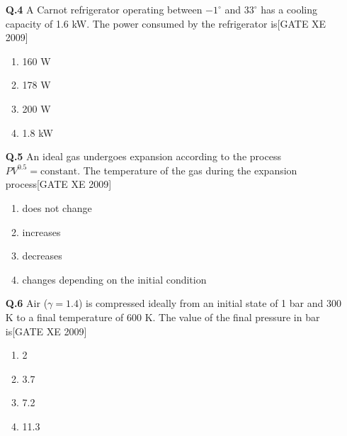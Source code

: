 \documentclass[journal,12pt,onecolumn]{IEEEtran}
\theoremstyle{remark}
\begin{document}
\begin{enumerate}
\begin{enumerate}
\begin{enumerate}
\vspace{0.3cm}

\item[\textbf{Q.4}]  A Carnot refrigerator operating between $-1^\circ$  and $33^\circ$  has a cooling capacity of 1.6 kW. The power consumed by the refrigerator is\hfill[GATE XE 2009]
\begin{multicols}{2}
\begin{enumerate}
    \item 160 W
    \item 178 W
    \item 200 W
    \item 1.8 kW
\end{enumerate}
\end{multicols}

\vspace{0.3cm}

\item[\textbf{Q.5}] An ideal gas undergoes expansion according to the process $PV^{0.5} = \text{constant}$. The temperature of the gas during the expansion process\hfill[GATE XE 2009]
\begin{multicols}{2}
\begin{enumerate}
    \item does not change
    \item increases
    \item decreases
    \item changes depending on the initial condition
\end{enumerate}
\end{multicols}

\vspace{0.3cm}

\item[\textbf{Q.6}]  Air ($\gamma=1.4$) is compressed ideally from an initial state of 1 bar and 300 K to a final temperature of 600 K. The value of the final pressure in bar is\hfill[GATE XE 2009]
\begin{multicols}{2}
\begin{enumerate}
    \item 2
    \item 3.7
    \item 7.2
    \item 11.3
\end{enumerate}
\end{multicols}

\vspace{0.3cm}


\end{enumerate}
\end{enumerate}
\end{enumerate}
\end{document}

